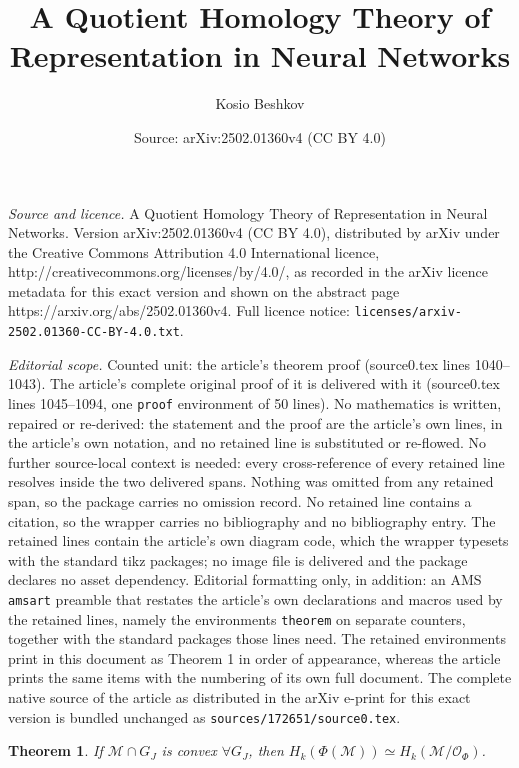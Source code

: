 \documentclass[10pt,a4paper]{amsart}
\title{A Quotient Homology Theory of Representation in Neural Networks}
\author{Kosio Beshkov}
\date{Source: arXiv:2502.01360v4 (CC BY 4.0)}
\newtheorem{theorem}{Theorem}
\begin{document}
\maketitle

\noindent\emph{Source and licence.} A Quotient Homology Theory of Representation in Neural Networks. Version arXiv:2502.01360v4 (CC BY 4.0), distributed by arXiv under the Creative Commons Attribution 4.0 International licence, http://creativecommons.org/licenses/by/4.0/, as recorded in the arXiv licence metadata for this exact version and shown on the abstract page https://arxiv.org/abs/2502.01360v4. Full licence notice: \texttt{licenses/arxiv-2502.01360-CC-BY-4.0.txt}.\par\smallskip

\noindent\textit{Editorial scope.} Counted unit: the article's theorem proof (source0.tex lines 1040--1043). The article's complete original proof of it is delivered with it (source0.tex lines 1045--1094, one \texttt{proof} environment of 50 lines). No mathematics is written, repaired or re-derived: the statement and the proof are the article's own lines, in the article's own notation, and no retained line is substituted or re-flowed.  No further source-local context is needed: every cross-reference of every retained line resolves inside the two delivered spans.  Nothing was omitted from any retained span, so the package carries no omission record.  No retained line contains a citation, so the wrapper carries no bibliography and no bibliography entry.  The retained lines contain the article's own diagram code, which the wrapper typesets with the standard tikz packages; no image file is delivered and the package declares no asset dependency.  Editorial formatting only, in addition: an AMS \texttt{amsart} preamble that restates the article's own declarations and macros used by the retained lines, namely the environments \texttt{theorem} on separate counters, together with the standard packages those lines need.  The retained environments print in this document as Theorem 1 in order of appearance, whereas the article prints the same items with the numbering of its own full document.  The complete native source of the article as distributed in the arXiv e-print for this exact version is bundled unchanged as \texttt{sources/172651/source0.tex}.
\begin{theorem}    
    \label{Convex homology proof}
    If $\mathcal{M}\cap G_J$ is convex $\forall G_J$, then $H_k(\Phi(\mathcal{M})) \simeq H_k(\mathcal{M}/\mathcal{O}_\Phi)$.
\end{theorem}
\end{document}
